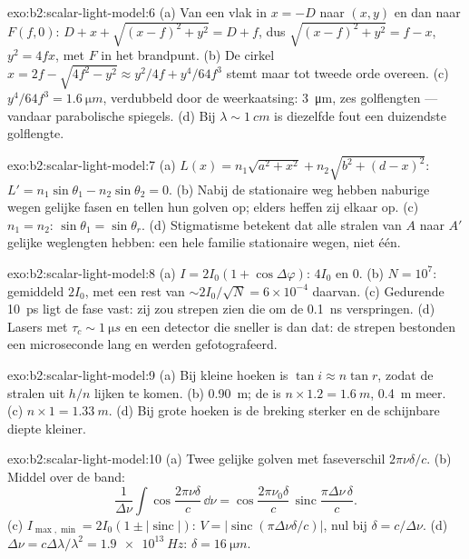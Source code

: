 \begin{solution}{exo:b2:scalar-light-model:6}
(a) Van een vlak  in $x = -D$ naar $(x, y)$ en dan naar $F(f, 0)$:
$D + x
+ \sqrt{(x - f)^2 + y^2} = D + f$, dus
$\sqrt{(x - f)^2 + y^2} = f - x$, $y^2 = 4fx$, met $F$ in het brandpunt. (b)
De cirkel $x = 2f - \sqrt{4f^2 - y^2} \approx y^2/4f +
y^4/64f^3$ stemt maar
tot tweede orde overeen. (c) $y^4/64f^3 = \qty{1.6}{\micro m}$, verdubbeld
door de weerkaatsing: \qty{3}{\micro m}, zes golflengten --- vandaar
parabolische spiegels. (d) Bij $\lambda \sim \qty{1}{cm}$ is diezelfde fout
een duizendste golflengte.
\end{solution}

\begin{solution}{exo:b2:scalar-light-model:7}
(a) $L(x) = n_1\sqrt{a^2 + x^2} + n_2\sqrt{b^2 + (d - x)^2}$:
$L' = n_1\sin\theta_1 -
n_2\sin\theta_2 = 0$. (b) Nabij de stationaire weg
hebben naburige wegen gelijke fasen en tellen hun golven op; elders heffen
zij elkaar op. (c) $n_1 = n_2$: $\sin\theta_1 = \sin\theta_r$. (d)
Stigmatisme betekent dat alle stralen van $A$ naar $A'$ gelijke weglengten
hebben: een hele familie stationaire wegen, niet één.
\end{solution}

\begin{solution}{exo:b2:scalar-light-model:8}
(a) $I = 2I_0(1 + \cos\Delta\varphi)$: $4I_0$ en $0$. (b) $N = 10^7$:
gemiddeld $2I_0$, met een rest van $\sim 2I_0/\sqrt N = 6 \times 10^{-4}$
daarvan. (c) Gedurende \qty{10}{ps} ligt de fase vast: zij zou strepen zien
die om de \qty{0.1}{ns} verspringen. (d) Lasers met
$\tau_c \sim \qty{1}{\micro s}$ en een detector die sneller is dan dat: de
strepen bestonden een microseconde lang en werden gefotografeerd.
\end{solution}

\begin{solution}{exo:b2:scalar-light-model:9}
(a) Bij kleine hoeken is $\tan i \approx n\tan r$, zodat de stralen uit
$h/n$ lijken te komen. (b) \qty{0.90}{m}; de  is
$n \times 1.2 = \qty{1.6}{m}$, \qty{0.4}{m} meer. (c)
$n \times 1 = \qty{1.33}{m}$. (d) Bij grote hoeken is de breking sterker en
de schijnbare diepte kleiner.
\end{solution}

\begin{solution}{exo:b2:scalar-light-model:10}
(a) Twee gelijke golven met faseverschil $2\pi\nu\delta/c$. (b) Middel over de band:
\[
\frac1{\Delta\nu}\int\cos\frac{2\pi\nu\delta}c\,\dd\nu = \cos\frac{2\pi\nu_0\delta}c\,\operatorname{sinc}\frac{\pi\Delta\nu\,\delta}c .
\]
(c) $I_{\max, \min} = 2I_0(1 \pm |\operatorname{sinc}|)$:
$V = |\operatorname{sinc}(\pi\Delta\nu\delta/c)|$, nul bij
$\delta = c/\Delta\nu$. (d)
$\Delta\nu = c\Delta\lambda/\lambda^2 = \qty{1.9e13}{Hz}$:
$\delta =
\qty{16}{\micro m}$.
\end{solution}

